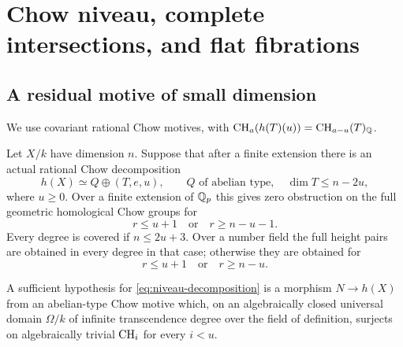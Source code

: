 \section{Chow niveau, complete intersections, and flat fibrations}\label{sec:niveau}

\subsection{A residual motive of small dimension}

We use covariant rational Chow motives, with
$\operatorname{CH}_a(h(T)(u))=\operatorname{CH}_{a-u}(T)_\mathbb Q$.

\begin{theorem}\label{thm:niveau}
Let $X/k$ have dimension $n$. Suppose that after a finite extension
there is an actual rational Chow decomposition
\begin{equation}\label{eq:niveau-decomposition}
 h(X)\simeq Q\oplus(T,e,u),\qquad
 Q\text{ of abelian type},\quad \dim T\leq n-2u,
\end{equation}
where $u\geq0$. Over a finite extension of $\mathbb Q_p$ this gives zero
obstruction on the full geometric homological Chow groups for
\begin{equation}\label{eq:niveau-local}
 r\leq u+1\quad\text{or}\quad r\geq n-u-1.
\end{equation}
Every degree is covered if $n\leq2u+3$. Over a number field the full
height pairs are obtained in every degree in that case; otherwise
they are obtained for
\begin{equation}\label{eq:niveau-height}
 r\leq u+1\quad\text{or}\quad r\geq n-u.
\end{equation}

A sufficient hypothesis for \eqref{eq:niveau-decomposition} is a
morphism $N\to h(X)$ from an abelian-type Chow motive which, on an
algebraically closed universal domain $\Omega/k$ of infinite
transcendence degree over the field of definition, surjects on
algebraically trivial $\operatorname{CH}_i$ for every $i<u$.
\end{theorem}

